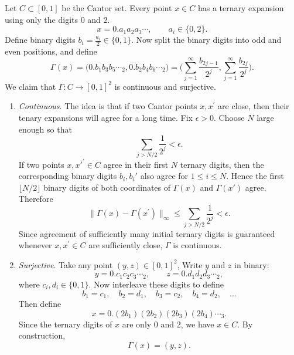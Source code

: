 	\begin{example}
		Let $C \subset [0,1]$ be the Cantor set. Every point $x \in C$ has a ternary expansion using only the digits $0$ and $2$. 
		\begin{equation}
			x = 0.a_1a_2a_3\cdots, \qquad a_i \in \{0,2\}.
		\end{equation}
		Define binary digits $b_i = \frac{a_i}{2} \in \{0,1\}$. Now split the binary digits into odd and even positions, and define
		\begin{equation}
			\Gamma(x) = \big(
				0.b_1b_3b_5\cdots_2,
				0.b_2b_4b_6\cdots_2
			\big) =
			\bigg(
				\sum_{j=1}^{\infty} \frac{b_{2j-1}}{2^j},
				\sum_{j=1}^{\infty} \frac{b_{2j}}{2^j}
			\bigg).
		\end{equation}
		We claim that $\Gamma: C \to [0, 1]^2$ is continuous and surjective. 
		\begin{enumerate}
		  \item \textit{Continuous}. The idea is that if two Cantor points $x, x^\prime$ are close, then their tenary expansions will agree for a long time. Fix $\epsilon > 0$. Choose $N$ large enough so that
				\begin{equation}
					\sum_{j > N/2} \frac{1}{2^j} < \epsilon.
				\end{equation}
				If two points $x,x'^\prime \in C$ agree in their first $N$ ternary digits, then the corresponding binary digits $b_i,b_i'$ also agree for $1 \leq i \leq N$. Hence the first $\lfloor N/2 \rfloor$ binary digits of both coordinates of $\Gamma(x)$ and $\Gamma(x')$ agree. Therefore
				\begin{equation}
					\|\Gamma(x)-\Gamma(x^\prime)\|_\infty \leq \sum_{j > N/2} \frac{1}{2^j} < \epsilon.
				\end{equation}
				Since agreement of sufficiently many initial ternary digits is guaranteed whenever $x,x^\prime \in C$ are sufficiently close, $\Gamma$ is continuous.
			
			\item \textit{Surjective}. Take any point $(y,z) \in [0,1]^2$, Write $y$ and $z$ in binary:
				\begin{equation}
					y = 0.c_1c_2c_3\cdots_2,
					\qquad
					z = 0.d_1d_2d_3\cdots_2,
				\end{equation}
				where $c_i,d_i \in \{0,1\}$. Now interleave these digits to define
				\begin{equation}
					b_1 = c_1,\quad b_2 = d_1,\quad b_3 = c_2,\quad b_4 = d_2,
					\quad \ldots
				\end{equation}
				Then define
				\begin{equation}
					x = 0.(2b_1)(2b_2)(2b_3)(2b_4)\cdots_3.
				\end{equation}
				Since the ternary digits of $x$ are only $0$ and $2$, we have $x \in C$.
				By construction,
				\begin{equation}
					\Gamma(x) = (y,z).
				\end{equation}
		\end{enumerate}
		

\end{example}
